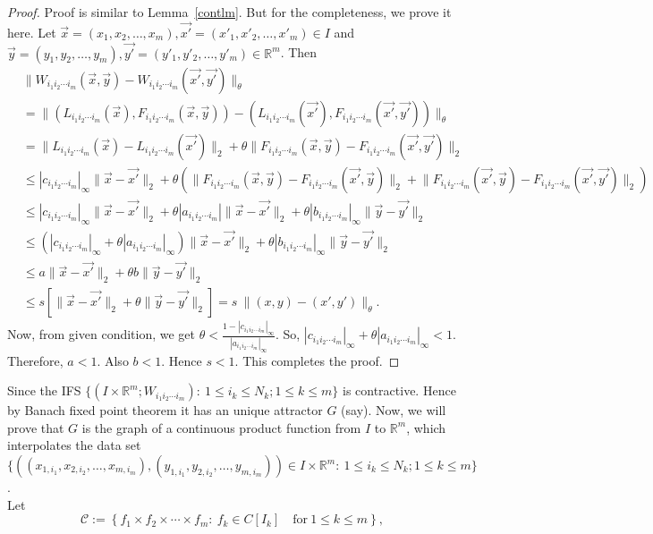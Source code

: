 \documentclass[10pt]{amsart}
\theoremstyle{definition}
\newcommand{\myseries}[3]{#1\leq #2\leq #3}
\newcommand{\myvec}[3]{#1=(#2_1,#2_2,\ldots,#2_#3)}
\newcommand{\norm}[2]{\lVert #1 \rVert_#2}
\newcommand{\profunc}[1]{#1_1\times#1_2\times\cdots\times#1_m}
\newcommand{\prodifs}[1]{#1_{i_1i_2\cdots i_m}}
\newcommand{\prodpoint}[2]{#1_{1,#2_1},#1_{2,#2_2},\ldots,#1_{m,#2_m}}
\begin{document}
	\begin{proof}
		Proof is similar to  Lemma~\ref{contlm}. But for the completeness, we prove it here. Let $\myvec{\vec{x}}{x}{m},\myvec{\vec{x'}}{x'}{m}\in I$ and $\myvec{\vec{y}}{y}{m},\myvec{\vec{y'}}{y'}{m}\in\mathbb{R}^m$. Then
		\begin{align*}
			&\norm{\prodifs{W}(\vec{x},\vec{y})-\prodifs{W}(\vec{x'},\vec{y'})}{\theta}\\
			&=\norm{(\prodifs{L}(\vec{x}),\prodifs{F}(\vec{x},\vec{y}))-(\prodifs{L}(\vec{x'}),\prodifs{F}(\vec{x'},\vec{y'}))}{\theta}\\
			&=\norm{\prodifs{L}(\vec{x})-\prodifs{L}(\vec{x'})}{2}+\theta\norm{\prodifs{F}(\vec{x},\vec{y})-\prodifs{F}(\vec{x'},\vec{y'})}{2}\\
			&\leq |\prodifs{c}|_{\infty}\norm{\vec{x}-\vec{x'}}{2}+\theta\left(\norm{\prodifs{F}(\vec{x},\vec{y})-\prodifs{F}(\vec{x'},\vec{y})}{2}+\norm{\prodifs{F}(\vec{x'},\vec{y})-\prodifs{F}(\vec{x'},\vec{y'})}{2}\right)\\
			&\leq |\prodifs{c}|_{\infty}\norm{\vec{x}-\vec{x'}}{2}+\theta|\prodifs{a}|\norm{\vec{x}-\vec{x'}}{2}+\theta|\prodifs{b}|_{\infty}\norm{\vec{y}-\vec{y'}}{2}\\
			&\leq \left(|\prodifs{c}|_{\infty}+\theta|\prodifs{a}|_{\infty}\right)\norm{\vec{x}-\vec{x'}}{2}+\theta|\prodifs{b}|_{\infty}\norm{\vec{y}-\vec{y'}}{2}\\
			&\leq a \norm{\vec{x}-\vec{x'}}{2}+\theta b \norm{\vec{y}-\vec{y'}}{2}\\
			&\leq s \left[\norm{\vec{x}-\vec{x'}}{2}+\theta\norm{\vec{y}-\vec{y'}}{2}\right]=s~\norm{(x,y)-(x',y')}{\theta}.
		\end{align*}
		Now, from given condition, we get $\theta<\frac{1-|\prodifs{c}|_{\infty}}{|\prodifs{a}|_{\infty}}$. So, $|\prodifs{c}|_{\infty}+\theta|\prodifs{a}|_{\infty}<1.$ Therefore, $a<1$. Also $b<1$. Hence $s<1$. This completes the proof.
	\end{proof}
	Since the IFS $\{(I\times\mathbb{R}^m;\prodifs{W}):~\myseries{1}{i_k}{N_k};\myseries{1}{k}{m}\}$ is contractive. Hence by Banach fixed point theorem it has an unique attractor $G$ (say). Now, we will prove that $G$ is the graph of a continuous product function from $I$ to $\mathbb{R}^m$, which interpolates the data set $\{((\prodpoint{x}{i}),(\prodpoint{y}{i}))\in I\times\mathbb{R}^m:~\myseries{1}{i_k}{N_k};\myseries{1}{k}{m}\}$.\\
	Let
	$$\mathscr{C}:=\left\{\profunc{f}:~f_k\in C[I_k]\quad\mbox{for}~\myseries{1}{k}{m}\right\},$$
\end{document}
